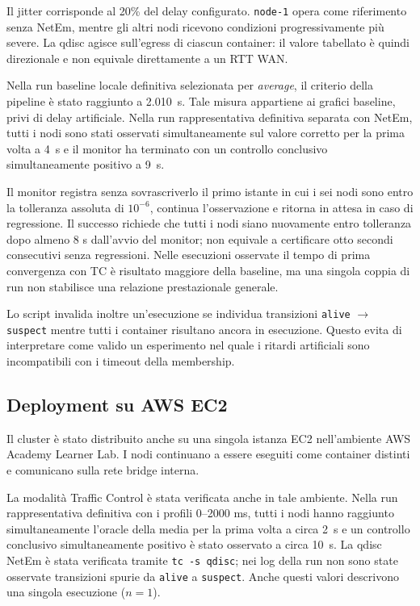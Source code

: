 \documentclass[conference]{IEEEtran}
\newcommand{\AvgConvTime}{2.010}
\newcommand{\TCLocalFirstConv}{4}
\newcommand{\TCLocalStable}{9}
\newcommand{\TCAWSFirstConv}{2}
\newcommand{\TCAWSStable}{10}
\begin{document}
Il jitter corrisponde al 20\% del delay configurato. \texttt{node-1} opera come riferimento senza NetEm, mentre gli altri nodi ricevono condizioni progressivamente più severe. La qdisc agisce sull'egress di ciascun container: il valore tabellato è quindi direzionale e non equivale direttamente a un RTT WAN.

Nella run baseline locale definitiva selezionata per \emph{average}, il criterio della pipeline è stato raggiunto a \AvgConvTime~s. Tale misura appartiene ai grafici baseline, privi di delay artificiale. Nella run rappresentativa definitiva separata con NetEm, tutti i nodi sono stati osservati simultaneamente sul valore corretto per la prima volta a \TCLocalFirstConv~s e il monitor ha terminato con un controllo conclusivo simultaneamente positivo a \TCLocalStable~s.

Il monitor registra senza sovrascriverlo il primo istante in cui i sei nodi sono entro la tolleranza assoluta di $10^{-6}$, continua l'osservazione e ritorna in attesa in caso di regressione. Il successo richiede che tutti i nodi siano nuovamente entro tolleranza dopo almeno 8 s dall'avvio del monitor; non equivale a certificare otto secondi consecutivi senza regressioni. Nelle esecuzioni osservate il tempo di prima convergenza con TC è risultato maggiore della baseline, ma una singola coppia di run non stabilisce una relazione prestazionale generale.

Lo script invalida inoltre un'esecuzione se individua transizioni \texttt{alive} $\rightarrow$ \texttt{suspect} mentre tutti i container risultano ancora in esecuzione. Questo evita di interpretare come valido un esperimento nel quale i ritardi artificiali sono incompatibili con i timeout della membership.

\subsection{Deployment su AWS EC2}

Il cluster è stato distribuito anche su una singola istanza EC2 nell'ambiente AWS Academy Learner Lab. I nodi continuano a essere eseguiti come container distinti e comunicano sulla rete bridge interna.

La modalità Traffic Control è stata verificata anche in tale ambiente. Nella run rappresentativa definitiva con i profili 0--2000 ms, tutti i nodi hanno raggiunto simultaneamente l'oracle della media per la prima volta a circa \TCAWSFirstConv~s e un controllo conclusivo simultaneamente positivo è stato osservato a circa \TCAWSStable~s. La qdisc NetEm è stata verificata tramite \texttt{tc -s qdisc}; nei log della run non sono state osservate transizioni spurie da \texttt{alive} a \texttt{suspect}. Anche questi valori descrivono una singola esecuzione ($n=1$).
\end{document}
